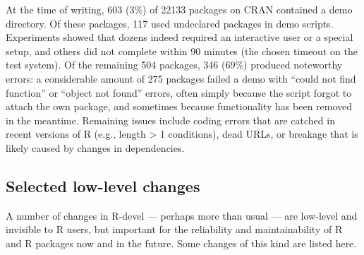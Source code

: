 \begin{itemize}
  At the time of writing, 603 (3\%) of 22133 packages on CRAN contained a
  demo directory. Of these packages, 117 used undeclared packages in demo
  scripts. Experiments showed that dozens indeed required an interactive
  user or a special setup, and others did not complete within 90 minutes
  (the chosen timeout on the test system).
  Of the remaining 504 packages, 346 (69\%) produced noteworthy errors:
  a considerable amount of 275 packages failed a demo
  with ``could not find function'' or ``object not found'' errors,
  often simply because the script forgot to attach the own package,
  and sometimes because functionality has been removed in the meantime.
  Remaining issues include coding errors that are catched in recent
  versions of R (e.g., length \textgreater{} 1 conditions), dead URLs, or breakage
  that is likely caused by changes in dependencies.
\end{itemize}

\subsection{Selected low-level changes}\label{selected-low-level-changes}

A number of changes in R-devel --- perhaps more than usual --- are
low-level and invisible to R users, but important for the
reliability and maintainability of R and R packages now and in the future.
Some changes of this kind are listed here.

